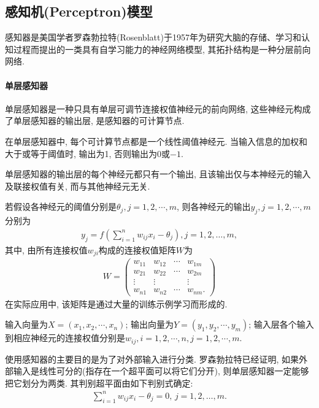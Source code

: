 \subsection{感知机(Perceptron)模型}
    感知器是美国学者罗森勃拉特(Rosenblatt)于1957年为研究大脑的存储、学习和认知过程而提出的一类具有自学习能力的神经网络模型, 其拓扑结构是一种分层前向网络.
\paragraph{单层感知器}
单层感知器是一种只具有单层可调节连接权值神经元的前向网络, 这些神经元构成了单层感知器的输出层, 是感知器的可计算节点.

在单层感知器中, 每个可计算节点都是一个线性阈值神经元. 当输入信息的加权和大于或等于阈值时, 输出为1, 否则输出为0或$-1$.

单层感知器的输出层的每个神经元都只有一个输出, 且该输出仅与本神经元的输入及联接权值有关, 而与其他神经元无关.

若假设各神经元的阈值分别是$\theta_j, j=1,2,\cdots,m$, 则各神经元的输出$y_j, j=1,2,\cdots,m$分别为
\begin{align}
  {y}_{{j}}={f}\left(\sum_{{i}=1}^{{n}} w_{{ij}} {x}_{{i}}-\theta_{{j}}\right), {j}=1,2, \ldots, {m},
\end{align}
其中, 由所有连接权值$w_{ji}$构成的连接权值矩阵$W$为
\begin{align}
W=\left(
\begin{array}{llll}
{w_{11}} & {w_{12}} & \cdots          &w_{1 {m}} \\
{w_{21}} & {w_{22}} & \cdots         &w_{2 {m}} \\
{\vdots} & {\vdots} &                &\vdots\\
{w_{{n} 1}} & {w_{{n} 2}} & {\cdots} & {w_{{nm}}}.
\end{array}
\right)
\end{align}
在实际应用中, 该矩阵是通过大量的训练示例学习而形成的.

输入向量为$X=(x_1,x_2,\cdots,x_n)$; 输出向量为$Y=(y_1,y_2,\cdots,y_m)$;
输入层各个输入到相应神经元的连接权值分别是$w_{ij},i=1,2,\cdots,n, j=1,2,\cdots, m$.

使用感知器的主要目的是为了对外部输入进行分类. 罗森勃拉特已经证明, 如果外部输入是线性可分的(指存在一个超平面可以将它们分开), 则单层感知器一定能够把它划分为两类. 其判别超平面由如下判别式确定:
\begin{align}
    \sum_{i=1}^{n} w_{i j} x_{i}-\theta_{j}=0,\,j=1,2, \ldots, m.
\end{align}

